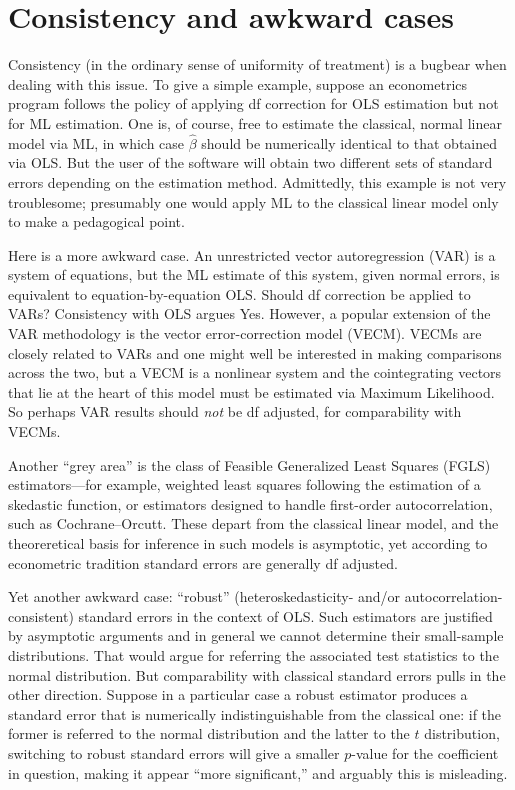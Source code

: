 \section{Consistency and awkward cases}
\label{sec:df-grey}

Consistency (in the ordinary sense of uniformity of treatment) is a
bugbear when dealing with this issue.  To give a simple example,
suppose an econometrics program follows the policy of applying df
correction for OLS estimation but not for ML estimation.  One is, of
course, free to estimate the classical, normal linear model via ML, in
which case $\hat\beta$ should be numerically identical to that
obtained via OLS.  But the user of the software will obtain two
different sets of standard errors depending on the estimation method.
Admittedly, this example is not very troublesome; presumably one would
apply ML to the classical linear model only to make a pedagogical
point.

Here is a more awkward case.  An unrestricted vector autoregression
(VAR) is a system of equations, but the ML estimate of this system,
given normal errors, is equivalent to equation-by-equation OLS.
Should df correction be applied to VARs? Consistency with OLS argues
Yes. However, a popular extension of the VAR methodology is the vector
error-correction model (VECM).  VECMs are closely related to VARs and
one might well be interested in making comparisons across the two, but
a VECM is a nonlinear system and the cointegrating vectors that lie at
the heart of this model must be estimated via Maximum Likelihood.  So
perhaps VAR results should \textit{not} be df adjusted, for
comparability with VECMs.

Another ``grey area'' is the class of Feasible Generalized Least
Squares (FGLS) estimators---for example, weighted least squares
following the estimation of a skedastic function, or estimators
designed to handle first-order autocorrelation, such as
Cochrane--Orcutt.  These depart from the classical linear model, and
the theoreretical basis for inference in such models is asymptotic,
yet according to econometric tradition standard errors are generally
df adjusted.

Yet another awkward case: ``robust'' (heteroskedasticity- and/or
autocorrelation-consistent) standard errors in the context of OLS.
Such estimators are justified by asymptotic arguments and in general
we cannot determine their small-sample distributions. That would argue
for referring the associated test statistics to the normal
distribution. But comparability with classical standard errors pulls
in the other direction. Suppose in a particular case a robust
estimator produces a standard error that is numerically
indistinguishable from the classical one: if the former is referred to
the normal distribution and the latter to the $t$ distribution,
switching to robust standard errors will give a smaller $p$-value for
the coefficient in question, making it appear ``more significant,''
and arguably this is misleading.



